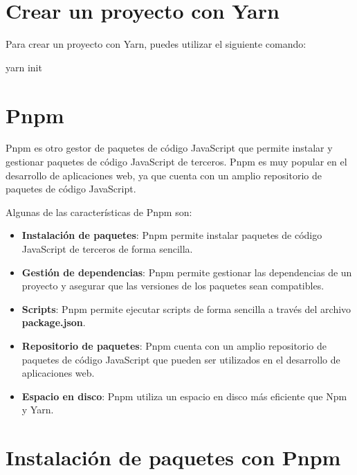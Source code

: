 \documentclass[
  a4paper,
  DIV=11,
  numbers=noendperiod,
  onepage,
  openany]{scrreprt}
\newenvironment{Shaded}{\begin{snugshade}}{\end{snugshade}}
\newcommand{\ExtensionTok}[1]{\textcolor[rgb]{0.00,0.23,0.31}{#1}}
\newcommand{\NormalTok}[1]{\textcolor[rgb]{0.00,0.23,0.31}{#1}}
\begin{document}
\begin{tcolorbox}
\section{Crear un proyecto con Yarn}\label{crear-un-proyecto-con-yarn}

Para crear un proyecto con Yarn, puedes utilizar el siguiente comando:

\begin{Shaded}
\begin{Highlighting}[]
\ExtensionTok{yarn}\NormalTok{ init}
\end{Highlighting}
\end{Shaded}

\section{Pnpm}\label{pnpm}

Pnpm es otro gestor de paquetes de código JavaScript que permite
instalar y gestionar paquetes de código JavaScript de terceros. Pnpm es
muy popular en el desarrollo de aplicaciones web, ya que cuenta con un
amplio repositorio de paquetes de código JavaScript.

Algunas de las características de Pnpm son:

\begin{itemize}
\item
  \textbf{Instalación de paquetes}: Pnpm permite instalar paquetes de
  código JavaScript de terceros de forma sencilla.
\item
  \textbf{Gestión de dependencias}: Pnpm permite gestionar las
  dependencias de un proyecto y asegurar que las versiones de los
  paquetes sean compatibles.
\item
  \textbf{Scripts}: Pnpm permite ejecutar scripts de forma sencilla a
  través del archivo \textbf{package.json}.
\item
  \textbf{Repositorio de paquetes}: Pnpm cuenta con un amplio
  repositorio de paquetes de código JavaScript que pueden ser utilizados
  en el desarrollo de aplicaciones web.
\item
  \textbf{Espacio en disco}: Pnpm utiliza un espacio en disco más
  eficiente que Npm y Yarn.
\end{itemize}

\section{Instalación de paquetes con
Pnpm}\label{instalaciuxf3n-de-paquetes-con-pnpm}


\end{tcolorbox}
\end{document}
